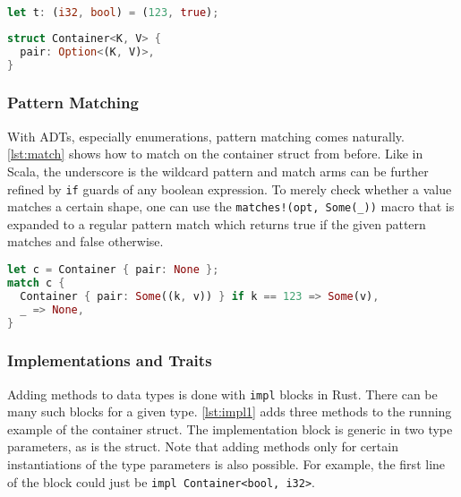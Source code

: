 \noindent\begin{minipage}[t]{.45\textwidth}
\begin{lstlisting}[language=Rust, style=short, caption={A two-tuple in Rust.}, label=lst:tuples]
let t: (i32, bool) = (123, true);
\end{lstlisting}
\end{minipage}\hfill
\begin{minipage}[t]{.45\textwidth}
\begin{lstlisting}[language=Rust, style=short, label={lst:container}, caption={The struct for the running example.}]
struct Container<K, V> {
  pair: Option<(K, V)>,
}
\end{lstlisting}
\end{minipage}

\subsubsection{Pattern Matching}

With ADTs, especially enumerations, pattern matching comes naturally.
\autoref{lst:match} shows how to match on the container struct from before. Like
in Scala, the underscore is the wildcard pattern and match arms can be further
refined by \lstinline!if! guards of any boolean expression. To merely check
whether a value matches a certain shape, one can use the
\lstinline"matches!(opt, Some(_))" macro that is expanded to a regular pattern
match which returns true if the given pattern matches and false otherwise.

\begin{lstlisting}[language=Rust, caption={Pattern matching on a struct.}, label=lst:match]
let c = Container { pair: None };
match c {
  Container { pair: Some((k, v)) } if k == 123 => Some(v),
  _ => None,
}
\end{lstlisting}

\subsubsection{Implementations and Traits}

Adding methods to data types is done with \lstinline!impl! blocks in Rust. There
can be many such blocks for a given type. \autoref{lst:impl1} adds three methods
to the running example of the container struct. The implementation block is
generic in two type parameters, as is the struct. Note that adding methods only
for certain instantiations of the  type parameters is also possible. For
example, the first line of the block could just be \passthrough{\lstinline!impl
Container<bool, i32>!}.

